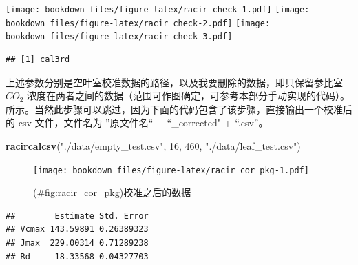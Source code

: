 \documentclass[]{krantz}
\makeatletter
\newenvironment{Shaded}{\begin{snugshade}}{\end{snugshade}}
\newcommand{\KeywordTok}[1]{\textcolor[rgb]{0.13,0.29,0.53}{\textbf{#1}}}
\newcommand{\DataTypeTok}[1]{\textcolor[rgb]{0.13,0.29,0.53}{#1}}
\newcommand{\DecValTok}[1]{\textcolor[rgb]{0.00,0.00,0.81}{#1}}
\newcommand{\FloatTok}[1]{\textcolor[rgb]{0.00,0.00,0.81}{#1}}
\newcommand{\StringTok}[1]{\textcolor[rgb]{0.31,0.60,0.02}{#1}}
\newcommand{\OperatorTok}[1]{\textcolor[rgb]{0.81,0.36,0.00}{\textbf{#1}}}
\newcommand{\NormalTok}[1]{#1}
\newenvironment{kframe}{%
\medskip{}
\setlength{\fboxsep}{.8em}
 \def\at@end@of@kframe{}%
 \ifinner\ifhmode%
  \def\at@end@of@kframe{\end{minipage}}%
  \begin{minipage}{\columnwidth}%
 \fi\fi%
 \def\FrameCommand##1{\hskip\@totalleftmargin \hskip-\fboxsep
 \colorbox{shadecolor}{##1}\hskip-\fboxsep
     \hskip-\linewidth \hskip-\@totalleftmargin \hskip\columnwidth}%
 \MakeFramed {\advance\hsize-\width
   \@totalleftmargin\z@ \linewidth\hsize
   \@setminipage}}%
 {\par\unskip\endMakeFramed%
 \at@end@of@kframe}
\renewenvironment{Shaded}{\begin{kframe}}{\end{kframe}}
\theoremstyle{definition}
\theoremstyle{definition}
\theoremstyle{definition}
\theoremstyle{remark}
\makeatother
\begin{document}
\texttt{[image: bookdown\_files/figure-latex/racir\_check-1.pdf]}
\texttt{[image: bookdown\_files/figure-latex/racir\_check-2.pdf]}
\texttt{[image: bookdown\_files/figure-latex/racir\_check-3.pdf]}

\begin{verbatim}
## [1] cal3rd
\end{verbatim}

上述参数分别是空叶室校准数据的路径，以及我要删除的数据，即只保留参比室
\(CO_2\)
浓度在两者之间的数据（范围可作图确定，可参考本部分手动实现的代码）。
所示。当然此步骤可以跳过，因为下面的代码包含了该步骤，直接输出一个校准后的
csv 文件，文件名为 ''原文件名`` + ``\_corrected" + ``.csv''。

\begin{Shaded}
\begin{Highlighting}[]
\KeywordTok{racircalcsv}\NormalTok{(}\StringTok{"./data/empty_test.csv"}\NormalTok{, }\DecValTok{16}\NormalTok{, }\DecValTok{460}\NormalTok{, }\StringTok{"./data/leaf_test.csv"}\NormalTok{)}
\end{Highlighting}
\end{Shaded}

\begin{figure}
\centering
\texttt{[image: bookdown\_files/figure-latex/racir\_cor\_pkg-1.pdf]}
\caption{(\#fig:racir\_cor\_pkg)校准之后的数据}
\end{figure}

\begin{Shaded}
\end{Shaded}

\begin{verbatim}
##        Estimate Std. Error
## Vcmax 143.59891 0.26389323
## Jmax  229.00314 0.71289238
## Rd     18.33568 0.04327703
\end{verbatim}
\end{document}
